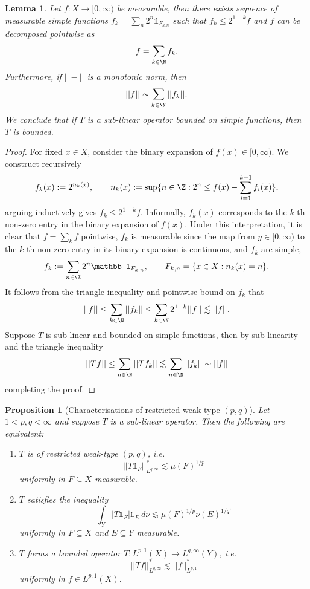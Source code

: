\documentclass[reqno]{amsart}
\newtheorem{proposition}[theorem]{Proposition}
\newtheorem{lemma}[theorem]{Lemma}
\theoremstyle{definition}
\theoremstyle{remark}
\begin{document}
\begin{lemma}
	Let $f: X \to [0, \infty)$ be measurable, then there exists sequence of measurable simple functions $f_k = \sum_n 2^n \mathbb 1_{F_{k, n}}$ such that $f_k \leq 2^{1-k} f$ and $f$ can be decomposed pointwise as
		\[ f = \sum_{k \in \N} f_k.\]
	Furthermore, if $|| - ||$ is a monotonic norm, then 
		\[ ||f|| \sim \sum_{k \in \N} ||f_k||. \]
	We conclude that if $T$ is a sub-linear operator bounded on simple functions, then $T$ is bounded. 	\label{lem:binary}
\end{lemma}

\begin{proof}
	For fixed $x \in X$, consider the binary expansion of $f(x) \in [0, \infty)$. We construct recursively
		\[ f_k (x) := 2^{n_k (x)}, \qquad n_k (x) := \sup \{ n \in \Z : 2^n \leq f(x)- \sum_{i = 1}^{k - 1} f_i (x) \}, \]
	arguing inductively gives $f_k \leq 2^{1 - k} f$. 	 Informally, $f_k(x)$ corresponds to the $k$-th non-zero entry in the binary expansion of $f(x)$. Under this interpretation, it is clear that $f = \sum_k f$ pointwise, $f_k$ is measurable since the map from $y \in [0, \infty)$ to the $k$-th non-zero entry in its binary expansion is continuous, and $f_k$ are simple, 
		\[ f_k := \sum_{n \in \Z} 2^n \mathbb 1_{F_{k, n}}, \qquad F_{k , n} = \{ x \in X : n_k (x) = n \}. \] 
	It follows from the triangle inequality and pointwise bound on $f_k$ that
		\[ ||f|| \leq \sum_{k \in \N} ||f_k|| \leq \sum_{k \in \N} 2^{1 - k} ||f|| \lesssim ||f||. \]
	Suppose $T$ is sub-linear and bounded on simple functions, then by sub-linearity and the triangle inequality 
		\[ ||Tf|| \leq \sum_{n \in \N} ||T f_k|| \lesssim \sum_{n \in \N}||f_k|| \sim ||f||  \]
	completing the proof. 	
\end{proof}

\begin{proposition}[Characterisations of restricted weak-type $(p, q)$]
	Let $1 < p, q < \infty$ and suppose $T$ is a sub-linear operator. Then the following are equivalent:
	\begin{enumerate}
		\item $T$ is of restricted weak-type $(p, q)$, i.e.
			\[ ||T \mathbb 1_F||_{L^{q, \infty}}^* \lesssim \mu (F)^{1/p}  \]
			uniformly in $F \subseteq X$ measurable.	
		\item $T$ satisfies the inequality
			\[ \int_Y |T \mathbb 1_F | \mathbb 1_E \, d \nu \lesssim \mu(F)^{1/p} \nu(E)^{1/q'} \]
			uniformly in $F \subseteq X$ and $E \subseteq Y$ measurable. 
		\item $T$ forms a bounded operator $T: L^{p, 1} (X) \to L^{q, \infty} (Y)$,  i.e.
			\[ ||Tf||_{L^{q, \infty}}^* \lesssim ||f||_{L^{p, 1}}^* \]
		uniformly in $f \in L^{p, 1} (X)$.	
	\end{enumerate}\label{prop:restricted}
\end{proposition}
\end{document}
